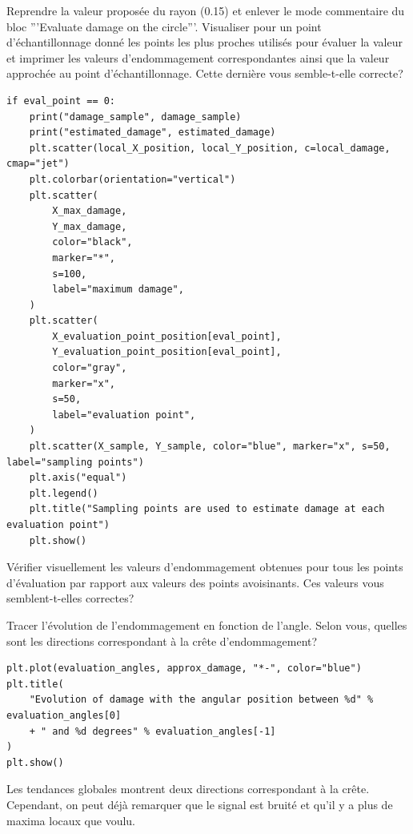\documentclass[french,12pt]{exam}
\begin{document}
\begin{questions}

\question Reprendre la valeur proposée du rayon (0.15) et enlever le mode commentaire du bloc '''Evaluate damage on the circle'''. Visualiser pour un point d'échantillonnage donné les points les plus proches utilisés pour évaluer la valeur et imprimer les valeurs d'endommagement correspondantes ainsi que la valeur approchée au point d'échantillonnage. Cette dernière vous semble-t-elle correcte?

\begin{solution}
\begin{lstlisting}
if eval_point == 0:
    print("damage_sample", damage_sample)
    print("estimated_damage", estimated_damage)
    plt.scatter(local_X_position, local_Y_position, c=local_damage, cmap="jet")
    plt.colorbar(orientation="vertical")
    plt.scatter(
        X_max_damage,
        Y_max_damage,
        color="black",
        marker="*",
        s=100,
        label="maximum damage",
    )
    plt.scatter(
        X_evaluation_point_position[eval_point],
        Y_evaluation_point_position[eval_point],
        color="gray", 
        marker="x",
        s=50,
        label="evaluation point",
    )
    plt.scatter(X_sample, Y_sample, color="blue", marker="x", s=50, label="sampling points")
    plt.axis("equal")
    plt.legend()
    plt.title("Sampling points are used to estimate damage at each evaluation point")
    plt.show()
\end{lstlisting}
\end{solution}
\question Vérifier visuellement les valeurs d'endommagement obtenues pour tous les points d'évaluation par rapport aux valeurs des points avoisinants. Ces valeurs vous semblent-t-elles correctes?

\question Tracer l'évolution de l'endommagement en fonction de l'angle. Selon vous, quelles sont les directions correspondant à la crête d'endommagement?

\begin{solution}
\begin{lstlisting}
plt.plot(evaluation_angles, approx_damage, "*-", color="blue")
plt.title(
    "Evolution of damage with the angular position between %d" % evaluation_angles[0]
    + " and %d degrees" % evaluation_angles[-1]
)
plt.show()
\end{lstlisting}
Les tendances globales montrent deux directions correspondant à la crête. Cependant, on peut déjà remarquer que le signal est bruité et qu'il y a plus de maxima locaux que voulu.
\end{solution}


\end{questions}
\end{document}
